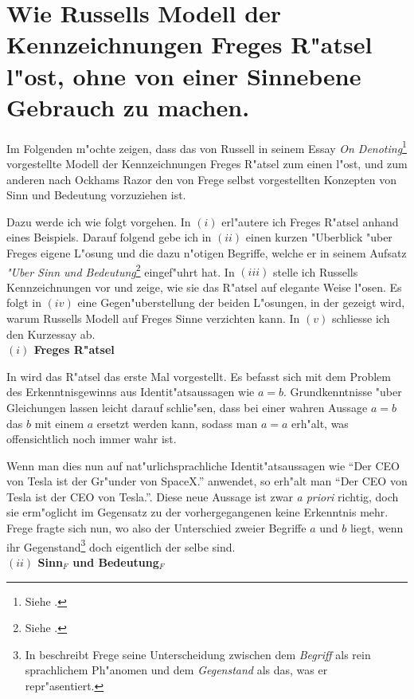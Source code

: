 \documentclass[a4paper, emulatestandardclasses, 12pt]{scrartcl}
\begin{document}
\section*{Wie Russells Modell der Kennzeichnungen Freges R"atsel l"ost, ohne von einer Sinnebene Gebrauch zu machen.}
\begin{onehalfspace} 


Im Folgenden m"ochte zeigen, dass das von Russell in seinem Essay \emph{On Denoting}\footnote{Siehe \citep*{russell1905denoting}.} vorgestellte Modell der Kennzeichnungen Freges R"atsel zum einen l"ost, und zum anderen nach Ockhams Razor den von Frege selbst vorgestellten Konzepten von Sinn und Bedeutung vorzuziehen ist.

Dazu werde ich wie folgt vorgehen. In $(i)$ erl"autere ich Freges R"atsel anhand eines Beispiels. Darauf folgend gebe ich in $(ii)$ einen kurzen "Uberblick "uber Freges eigene L"osung und die dazu n"otigen Begriffe, welche er in seinem Aufsatz \emph{"Uber Sinn und Bedeutung}\footnote{Siehe \citep{sinnundbedeutung}.} eingef"uhrt hat. In $(iii)$ stelle ich Russells Kennzeichnungen vor und zeige, wie sie das R"atsel auf elegante Weise l"osen. Es folgt in $(iv)$ eine Gegen"uberstellung der beiden L"osungen, in der gezeigt wird, warum Russells Modell auf Freges Sinne verzichten kann. In $(v)$ schliesse ich den Kurzessay ab.\\ 
\noindent\textbf{$(i)$ Freges R"atsel}

In \citep{sinnundbedeutung} wird das R"atsel das erste Mal vorgestellt. Es befasst sich mit dem Problem des Erkenntnisgewinns aus Identit"atsaussagen wie $a = b$. Grundkenntnisse "uber Gleichungen lassen leicht darauf schlie"sen, dass bei einer wahren Aussage $a = b$ das $b$ mit einem $a$ ersetzt werden kann, sodass man $a = a$ erh"alt, was offensichtlich noch immer wahr ist.

Wenn man dies nun auf nat"urlichsprachliche Identit"atsaussagen wie "`Der CEO von Tesla ist der Gr"under von SpaceX."' anwendet, so erh"alt man "`Der CEO von Tesla ist der CEO von Tesla."'. Diese neue Aussage ist zwar \emph{a priori} richtig, doch sie erm"oglicht im Gegensatz zu der vorhergegangenen keine Erkenntnis mehr. Frege fragte sich nun, wo also der Unterschied zweier Begriffe $a$ und $b$ liegt, wenn ihr Gegenstand\footnote{In \citep{begriffundgegenstand} beschreibt Frege seine Unterscheidung zwischen dem \emph{Begriff} als rein sprachlichem Ph"anomen und dem \emph{Gegenstand} als das, was er repr"asentiert.} doch eigentlich der selbe sind.
\\\noindent\textbf{$(ii)$ Sinn$_{F}$ und Bedeutung$_{F}$}	


\end{onehalfspace}
\end{document}
